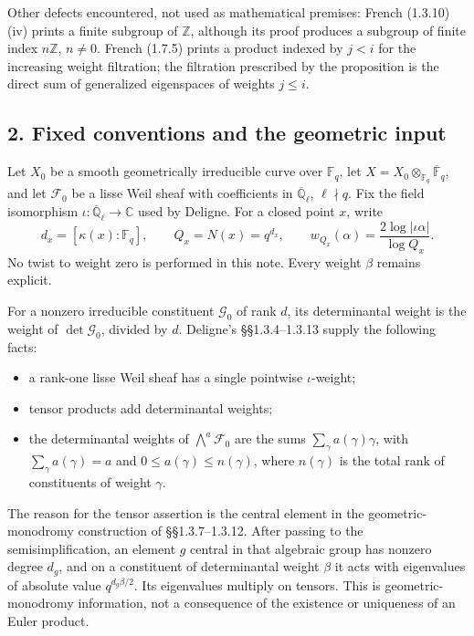Other defects encountered, not used as mathematical premises: French
(1.3.10)(iv) prints a finite subgroup of \(\mathbb Z\), although its
proof produces a subgroup of finite index \(n\mathbb Z\), \(n\ne0\).
French (1.7.5) prints a product indexed by \(j<i\) for the increasing
weight filtration; the filtration prescribed by the proposition is the
direct sum of generalized eigenspaces of weights \(j\le i\).

\subsection{2. Fixed conventions and the geometric
input}\label{fixed-conventions-and-the-geometric-input}

Let \(X_0\) be a smooth geometrically irreducible curve over
\(\mathbb F_q\), let
\(X=X_0\otimes_{\mathbb F_q}\overline{\mathbb F}_q\), and let
\(\mathcal F_0\) be a lisse Weil sheaf with coefficients in
\(\overline{\mathbb Q}_\ell\), \(\ell\nmid q\). Fix the field
isomorphism \(\iota:\overline{\mathbb Q}_\ell\to\mathbb C\) used by
Deligne. For a closed point \(x\), write \[
d_x=[\kappa(x):\mathbb F_q],\qquad Q_x=N(x)=q^{d_x},
\qquad
w_{Q_x}(\alpha)=\frac{2\log|\iota\alpha|}{\log Q_x}.
\tag{DW2.1}
\] No twist to weight zero is performed in this note. Every weight
\(\beta\) remains explicit.

For a nonzero irreducible constituent \(\mathcal G_0\) of rank \(d\),
its determinantal weight is the weight of \(\det\mathcal G_0\), divided
by \(d\). Deligne's §§1.3.4--1.3.13 supply the following facts:

\begin{itemize}
\tightlist
\item
  a rank-one lisse Weil sheaf has a single pointwise \(\iota\)-weight;
\item
  tensor products add determinantal weights;
\item
  the determinantal weights of \(\bigwedge^a\mathcal F_0\) are the sums
  \(\sum_\gamma a(\gamma)\gamma\), with \(\sum_\gamma a(\gamma)=a\) and
  \(0\le a(\gamma)\le n(\gamma)\), where \(n(\gamma)\) is the total rank
  of constituents of weight \(\gamma\).
\end{itemize}

The reason for the tensor assertion is the central element in the
geometric-monodromy construction of §§1.3.7--1.3.12. After passing to
the semisimplification, an element \(g\) central in that algebraic group
has nonzero degree \(d_g\), and on a constituent of determinantal weight
\(\beta\) it acts with eigenvalues of absolute value \(q^{d_g\beta/2}\).
Its eigenvalues multiply on tensors. This is geometric-monodromy
information, not a consequence of the existence or uniqueness of an
Euler product.

